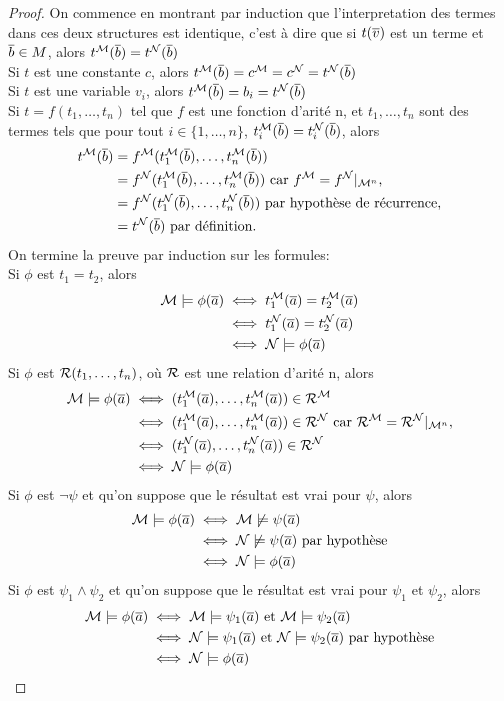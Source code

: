 \begin{proof}
On commence en montrant par induction que l'interpretation des termes dans ces deux structures est identique,
c'est à dire que si $t(\overline{v})$ est un terme et $\overline{b} \in M$, alors $t^{\mathcal{M}}(\overline{b}) = t^{\mathcal{N}}(\overline{b})$\\
Si $t$ est une constante $c$, alors  $t^{\mathcal{M}}(\overline{b}) = c^{\mathcal{M}} = c^{\mathcal{N}} = t^{\mathcal{N}}(\overline{b})$\\
Si $t$ est une variable $v_i$, alors $t^{\mathcal{M}}(\overline{b}) = b_i = t^{\mathcal{N}}(\overline{b})$\\
Si $t = f(t_1,\dots,t_n)$ tel que $f$ est une fonction d'arité n, et $t_1,\dots,t_n$ sont des termes tels que pour tout $i \in \{ 1,\dots,n \}$,
$t^{\mathcal{M}}_i(\overline{b}) = t^{\mathcal{N}}_i(\overline{b})$, alors
\begin{align*}
t^{\mathcal{M}}(\overline{b}) &= f^{\mathcal{M}}(t^{\mathcal{M}}_1(\overline{b}),\dots,t^{\mathcal{M}}_n(\overline{b}))\\
&= f^{\mathcal{N}}(t^{\mathcal{M}}_1(\overline{b}),\dots,t^{\mathcal{M}}_n(\overline{b})) \text{ car $f^{\mathcal{M}} = f^{\mathcal{N}} \vert_{\mathcal{M}^n}$,}\\
&= f^{\mathcal{N}}(t^{\mathcal{N}}_1(\overline{b}),\dots,t^{\mathcal{N}}_n(\overline{b})) \text{ par hypothèse de récurrence,}\\
&= t^{\mathcal{N}}(\overline{b}) \text{ par définition.}
\end{align*}
On termine la preuve par induction sur les formules:\\
Si $\phi$ est $t_1 = t_2$, alors
\begin{align*}
\mathcal{M} \models \phi(\overline{a}) &\iff t^{\mathcal{M}}_1(\overline{a}) = t^{\mathcal{M}}_2(\overline{a})\\
&\iff t^{\mathcal{N}}_1(\overline{a}) = t^{\mathcal{N}}_2(\overline{a})\\
&\iff \mathcal{N} \models \phi(\overline{a})
\end{align*}
Si $\phi$ est $\mathcal{R}(t_1,\dots,t_n)$, où $\mathcal{R}$ est une relation d'arité n, alors
\begin{align*}
\mathcal{M} \models \phi(\overline{a}) &\iff (t^{\mathcal{M}}_1(\overline{a}),\dots,t^{\mathcal{M}}_n(\overline{a})) \in \mathcal{R}^{\mathcal{M}}\\
&\iff (t^{\mathcal{M}}_1(\overline{a}),\dots,t^{\mathcal{M}}_n(\overline{a})) \in \mathcal{R}^{\mathcal{N}} \text{ car $\mathcal{R}^{\mathcal{M}} = \mathcal{R}^{\mathcal{N}} \vert_{\mathcal{M}^n}$,}\\
&\iff (t^{\mathcal{N}}_1(\overline{a}),\dots,t^{\mathcal{N}}_n(\overline{a})) \in \mathcal{R}^{\mathcal{N}}\\
&\iff \mathcal{N} \models \phi(\overline{a})
\end{align*}
Si $\phi$ est $\neg\psi$ et qu'on suppose que le résultat est vrai pour $\psi$, alors
\begin{align*}
\mathcal{M} \models \phi(\overline{a}) &\iff \mathcal{M} \not\models \psi(\overline{a})\\
&\iff \mathcal{N} \not\models \psi(\overline{a}) \text{ par hypothèse}\\
&\iff \mathcal{N} \models \phi(\overline{a})
\end{align*}
Si $\phi$ est $\psi_1 \wedge \psi_2$ et qu'on suppose que le résultat est vrai pour $\psi_1$ et $\psi_2$, alors
\begin{align*}
\mathcal{M} \models \phi(\overline{a}) &\iff \mathcal{M} \models \psi_1(\overline{a}) \text{ et } \mathcal{M} \models \psi_2(\overline{a})\\
&\iff \mathcal{N} \models \psi_1(\overline{a}) \text{ et } \mathcal{N} \models \psi_2(\overline{a}) \text{ par hypothèse}\\
&\iff \mathcal{N} \models \phi(\overline{a})
\end{align*}


\end{proof}
